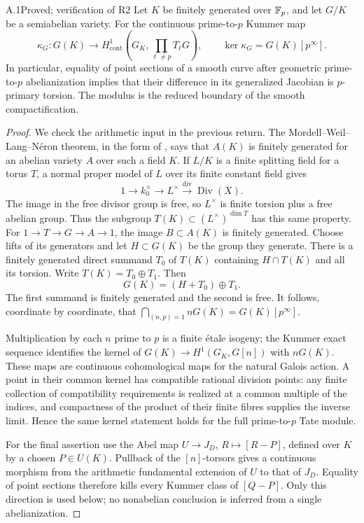 \begin{claim}{A.1}{Proved; verification of R2}
Let $K$ be finitely generated over $\mathbb F_p$, and let $G/K$ be a
semiabelian variety. For the continuous prime-to-$p$ Kummer map
\[
 \kappa_G:G(K)\longrightarrow
 H^1_{\mathrm{cont}}\left(G_K,\prod_{\ell\ne p}T_\ell G\right),
 \qquad
 \ker\kappa_G=G(K)[p^\infty].
\]
In particular, equality of point sections of a smooth curve after
geometric prime-to-$p$ abelianization implies that their difference in
its generalized Jacobian is $p$-primary torsion. The modulus is the
reduced boundary of the smooth compactification.
\end{claim}
\begin{proof}
We check the arithmetic input in the previous return. The
Mordell--Weil--Lang--N\'eron theorem, in the form of
\citet[I, Theorem 16.7]{A_Milne2008}, says that $A(K)$ is finitely
generated for an abelian variety $A$ over such a field $K$.
If $L/K$ is a finite splitting field for a torus $T$, a normal proper
model of $L$ over its finite constant field gives
\[
 1\longrightarrow k_0^\times\longrightarrow L^\times
 \xrightarrow{\operatorname{div}}\operatorname{Div}(X).
\]
The image in the free divisor group is free, so $L^\times$ is finite
torsion plus a free abelian group. Thus the subgroup
$T(K)\subset (L^\times)^{\dim T}$ has this same property.
For $1\to T\to G\to A\to1$, the image $B\subset A(K)$ is finitely
generated. Choose lifts of its generators and let $H\subset G(K)$ be
the group they generate. There is a finitely generated direct summand
$T_0$ of $T(K)$ containing $H\cap T(K)$ and all its torsion. Write
$T(K)=T_0\oplus T_1$. Then
\[
 G(K)=(H+T_0)\oplus T_1.
\]
The first summand is finitely generated and the second is free. It
follows, coordinate by coordinate, that
$\bigcap_{(n,p)=1}nG(K)=G(K)[p^\infty]$.

Multiplication by each $n$ prime to $p$ is a finite \'etale isogeny;
the Kummer exact sequence identifies the kernel of
$G(K)\to H^1(G_K,G[n])$ with $nG(K)$. These maps are continuous
cohomological maps for the natural Galois action. A point in their
common kernel has compatible rational division points: any finite
collection of compatibility requirements is realized at a common
multiple of the indices, and compactness of the product of their
finite fibres supplies the inverse limit. Hence the same kernel
statement holds for the full prime-to-$p$ Tate module.

For the final assertion use the Abel map
$U\to J_D$, $R\mapsto[R-P]$, defined over $K$ by a chosen
$P\in U(K)$. Pullback of the $[n]$-torsors gives a continuous
morphism from the arithmetic fundamental extension of $U$ to that of
$J_D$. Equality of point sections therefore kills every Kummer class
of $[Q-P]$. Only this direction is used below; no nonabelian conclusion
is inferred from a single abelianization.
\end{proof}

